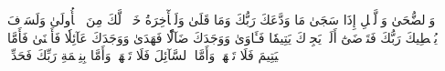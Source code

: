 وَٱلضُّحَىٰ
وَٱلَّيۡلِ إِذَا سَجَىٰ
مَا وَدَّعَكَ رَبُّكَ وَمَا قَلَىٰ
وَلَلۡأٓخِرَةُ خَيۡرٞ لَّكَ مِنَ ٱلۡأُولَىٰ
وَلَسَوۡفَ يُعۡطِيكَ رَبُّكَ فَتَرۡضَىٰٓ
أَلَمۡ يَجِدۡكَ يَتِيمٗا فَـَٔاوَىٰ
وَوَجَدَكَ ضَآلّٗا فَهَدَىٰ
وَوَجَدَكَ عَآئِلٗا فَأَغۡنَىٰ
فَأَمَّا ٱلۡيَتِيمَ فَلَا تَقۡهَرۡ
وَأَمَّا ٱلسَّآئِلَ فَلَا تَنۡهَرۡ
وَأَمَّا بِنِعۡمَةِ رَبِّكَ فَحَدِّثۡ